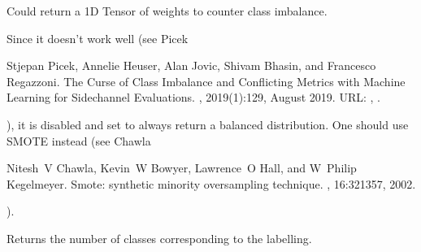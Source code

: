 \documentclass[letterpaper,10pt,english]{sphinxmanual}
\begin{document}
\begin{fulllineitems}
\begin{fulllineitems}
\begin{quote}
\begin{description}
\end{description}\end{quote}

\end{fulllineitems}


\begin{fulllineitems}
\label{\detokenize{MLSCAlib.Ciphers:MLSCAlib.Ciphers.leakage_model.LeakageModel.get_class_balance}}
\pysigstartsignatures
{}
\pysigstopsignatures
\sphinxAtStartPar
Could return a 1D Tensor of weights to counter class imbalance.

\sphinxAtStartPar
Since it doesn’t work well (see Picek %
\begin{footnote}[1]\sphinxAtStartFootnote
Stjepan Picek, Annelie Heuser, Alan Jovic, Shivam Bhasin, and Francesco Regazzoni. The Curse of Class Imbalance and Conflicting Metrics with Machine Learning for Side\sphinxhyphen{}channel Evaluations. , 2019(1):1\textendash{}29, August 2019. URL: , .
%
\end{footnote}), it is disabled and set to always return
a balanced distribution. One should use SMOTE instead (see Chawla %
\begin{footnote}[2]\sphinxAtStartFootnote
Nitesh V Chawla, Kevin W Bowyer, Lawrence O Hall, and W Philip Kegelmeyer. Smote: synthetic minority over\sphinxhyphen{}sampling technique. , 16:321\textendash{}357, 2002.
%
\end{footnote}).

\end{fulllineitems}


\begin{fulllineitems}
\label{\detokenize{MLSCAlib.Ciphers:MLSCAlib.Ciphers.leakage_model.LeakageModel.get_classes}}
\pysigstartsignatures
{}
\pysigstopsignatures
\sphinxAtStartPar
Returns the number of classes corresponding to the labelling.


\end{fulllineitems}
\end{fulllineitems}
\end{document}
